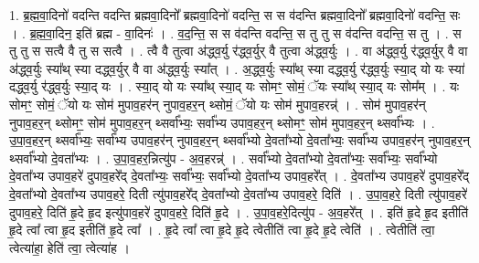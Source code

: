 \documentclass[17pt]{extarticle}
\begin{document}
1. ब्र॒ह्म॒वा॒दिनो॑ वदन्ति वदन्ति ब्रह्मवा॒दिनो᳚ ब्रह्मवा॒दिनो॑ वदन्ति॒ स स व॑दन्ति ब्रह्मवा॒दिनो᳚ ब्रह्मवा॒दिनो॑ वदन्ति॒ सः । . ब्र॒ह्म॒वा॒दिन॒ इति॑ ब्रह्म - वा॒दिनः॑ । . व॒द॒न्ति॒ स स व॑दन्ति वदन्ति॒ स तु तु स व॑दन्ति वदन्ति॒ स तु । . स तु तु स सत्वै वै तु स सत्वै । . त्वै वै तुत्वा अ॑द्ध्व॒र्यु र॑द्ध्व॒र्युर् वै तुत्वा अ॑द्ध्व॒र्युः । . वा अ॑द्ध्व॒र्यु र॑द्ध्व॒र्युर् वै वा अ॑द्ध्व॒र्युः स्या᳚थ् स्या दद्ध्व॒र्युर् वै वा अ॑द्ध्व॒र्युः स्या᳚त् । . अ॒द्ध्व॒र्युः स्या᳚थ् स्या दद्ध्व॒र्यु र॑द्ध्व॒र्युः स्या॒द् यो यः स्या॑ दद्ध्व॒र्यु र॑द्ध्व॒र्युः स्या॒द् यः । . स्या॒द् यो यः स्या᳚थ् स्या॒द् यः सोमꣳ॒॒ सोमं॒ ॅयः स्या᳚थ् स्या॒द् यः सोम᳚म् । . यः सोमꣳ॒॒ सोमं॒ ॅयो यः सोम॑ मुपाव॒हर॑न् नुपाव॒हर॒न् थ्सोमं॒ ॅयो यः सोम॑ मुपाव॒हरन्न्॑ । . सोम॑ मुपाव॒हर॑न् नुपाव॒हर॒न् थ्सोमꣳ॒॒ सोम॑ मुपाव॒हर॒न् थ्सर्वा᳚भ्यः॒ सर्वा᳚भ्य उपाव॒हर॒न् थ्सोमꣳ॒॒ सोम॑ मुपाव॒हर॒न् थ्सर्वा᳚भ्यः । . उ॒पा॒व॒हर॒न् थ्सर्वा᳚भ्यः॒ सर्वा᳚भ्य उपाव॒हर॑न् नुपाव॒हर॒न् थ्सर्वा᳚भ्यो दे॒वता᳚भ्यो दे॒वता᳚भ्यः॒ सर्वा᳚भ्य उपाव॒हर॑न् नुपाव॒हर॒न् थ्सर्वा᳚भ्यो दे॒वता᳚भ्यः । . उ॒पा॒व॒हर॒न्नित्यु॑प - अ॒व॒हरन्न्॑ । . सर्वा᳚भ्यो दे॒वता᳚भ्यो दे॒वता᳚भ्यः॒ सर्वा᳚भ्यः॒ सर्वा᳚भ्यो दे॒वता᳚भ्य उपाव॒हरे॑ दुपाव॒हरे᳚द् दे॒वता᳚भ्यः॒ सर्वा᳚भ्यः॒ सर्वा᳚भ्यो दे॒वता᳚भ्य उपाव॒हरे᳚त् । . दे॒वता᳚भ्य उपाव॒हरे॑ दुपाव॒हरे᳚द् दे॒वता᳚भ्यो दे॒वता᳚भ्य उपाव॒हरे॒ दिती त्यु॑पाव॒हरे᳚द् दे॒वता᳚भ्यो दे॒वता᳚भ्य उपाव॒हरे॒ दिति॑ । . उ॒पा॒व॒हरे॒ दिती त्यु॑पाव॒हरे॑ दुपाव॒हरे॒ दिति॑ हृ॒दे हृ॒द इत्यु॑पाव॒हरे॑ दुपाव॒हरे॒ दिति॑ हृ॒दे । . उ॒पा॒व॒हरे॒दित्यु॑प - अ॒व॒हरे᳚त् । . इति॑ हृ॒दे हृ॒द इतीति॑ हृ॒दे त्वा᳚ त्वा हृ॒द इतीति॑ हृ॒दे त्वा᳚ । . हृ॒दे त्वा᳚ त्वा हृ॒दे हृ॒दे त्वेतीति॑ त्वा हृ॒दे हृ॒दे त्वेति॑ । . त्वेतीति॑ त्वा॒ त्वेत्या॑हा॒ हेति॑ त्वा॒ त्वेत्या॑ह । \newline
\end{document}
